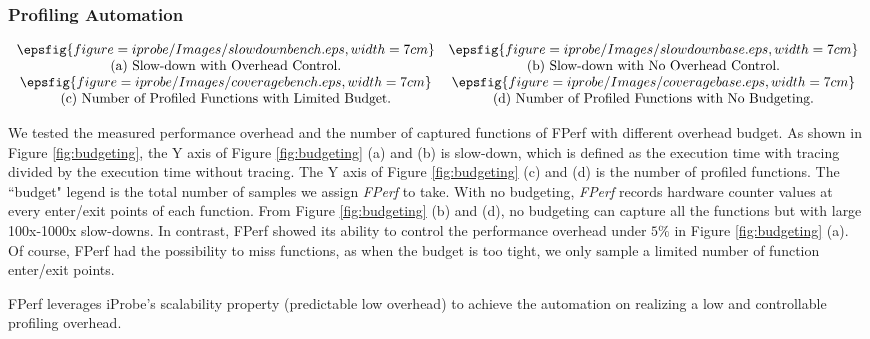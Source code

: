 \subsubsection{Profiling Automation}

\begin{figure*}[h!]
    \begin{center}
     $\begin{array} {cc}        
        \epsfig{figure=iprobe/Images/slowdownbench.eps,width=7cm} & \epsfig{figure=iprobe/Images/slowdownbase.eps,width=7cm}\\
        \mbox{(a) Slow-down with Overhead Control.} & \mbox{(b) Slow-down with No Overhead Control.}\\
        \epsfig{figure=iprobe/Images/coveragebench.eps,width=7cm} & \epsfig{figure=iprobe/Images/coveragebase.eps,width=7cm}\\
        \mbox{(c) Number of Profiled Functions with Limited Budget.} & \mbox{(d) Number of Profiled Functions with No Budgeting.}\\
        \end{array}$
    \end{center}
    \caption{Overhead Control and Number of Captured Functions Comparison.}
    \label{fig:budgeting}
\end{figure*} 

We tested the measured performance overhead and the number of captured functions of FPerf with different overhead budget. %
As shown in Figure \ref{fig:budgeting}, the Y axis of Figure \ref{fig:budgeting} (a) and (b) is slow-down, which is defined as the execution time with tracing divided by the execution time without tracing. 
The Y axis of Figure \ref{fig:budgeting} (c) and (d) is the number of profiled functions. The ``budget" legend is the total number of samples we assign \textit{FPerf} to take. 
With no budgeting, \textit{FPerf} records hardware counter values at every enter/exit points of each function. 
From Figure \ref{fig:budgeting} (b) and (d), no budgeting can capture all the functions but with large 100x-1000x slow-downs. 
In contrast, FPerf showed its ability to control the performance overhead under $5\%$ in Figure \ref{fig:budgeting} (a).
Of course, FPerf had the possibility to miss functions, as when the budget is too tight, we only sample a limited number of function enter/exit points.

FPerf leverages iProbe's scalability property (predictable low overhead) to achieve the automation on realizing a low and controllable profiling overhead.





